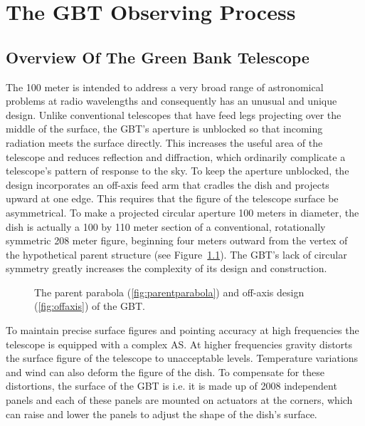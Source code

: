 \chapter{The GBT Observing Process}\label{chap:process}

\vspace{-0.5cm}

\section{Overview Of The Green Bank Telescope}

The 100 meter  is intended to address a very broad range 
of astronomical problems at radio wavelengths and consequently has an
unusual and unique design. Unlike conventional telescopes that have feed
legs projecting over the middle of the surface, the \gls{GBT}'s aperture
is unblocked so that incoming radiation meets the surface directly. This
increases the useful area of the telescope and reduces reflection and
diffraction, which ordinarily complicate a telescope's pattern of response
to the sky. To keep the aperture unblocked, the design incorporates an
off-axis feed arm that cradles the dish and projects upward at one edge.
This requires that the figure of the telescope surface be asymmetrical.
To make a projected circular aperture 100 meters in diameter, the dish is
actually a 100 by 110 meter section of a conventional, rotationally
symmetric 208 meter figure, beginning four meters outward from the
vertex of the hypothetical parent structure (see
Figure~\ref{fig:GBT}). The \gls{GBT}'s lack of circular symmetry
greatly increases the complexity of its design and construction.

\begin{figure}[!h]
\begin{center}
\hspace{.1\linewidth}
\caption[The parent parabola and off-axis design of the GBT]
{The parent parabola (\ref{fig:parentparabola}) and off-axis design
(\ref{fig:offaxis}) of the \gls{GBT}.\label{fig:GBT}}
\end{center}
\end{figure}

To maintain precise surface figures and pointing accuracy at high frequencies 
the telescope is equipped with a complex \gls{AS}. At higher frequencies
gravity distorts the surface figure of the telescope to unacceptable levels.
Temperature variations and wind can also deform the figure of the dish. To
compensate for these distortions, the surface of the \gls{GBT} is 
i.e. it is made up of 2008 independent panels and each of these panels are
mounted on actuators at the corners, which can raise and lower the panels to
adjust the shape of the dish's surface. 

